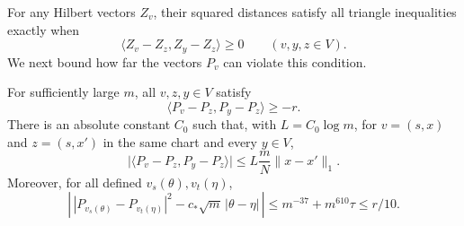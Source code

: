 For any Hilbert vectors $Z_v$, their squared distances satisfy all
triangle inequalities exactly when
\begin{equation}\label{rep:eq:angle}
\langle Z_v-Z_z,Z_y-Z_z\rangle\ge0
\qquad(v,y,z\in V).
\end{equation}
We next bound how far the vectors $P_v$ can violate this condition.

\begin{lemma}
\label{ker:angles}
For sufficiently large $m$, all $v,z,y\in V$ satisfy
\begin{equation}
\label{ker:global-angle}
 \langle P_v-P_z,P_y-P_z\rangle\ge-r.
\end{equation}
There is an absolute constant $C_0$ such that, with $L=C_0\log m$, for
$v=(s,x)$ and $z=(s,x')$ in the same chart and every $y\in V$,
\begin{equation}
\label{ker:local-angle}
 \bigl|\langle P_v-P_z,P_y-P_z\rangle\bigr|
 \le L\frac{m}{N}\|x-x'\|_1.
\end{equation}
Moreover, for all defined $v_s(\theta),v_t(\eta)$,
\begin{equation}
\label{ker:rounded-distance}
 \left|\,|P_{v_s(\theta)}-P_{v_t(\eta)}|^2
       -c_*\sqrt m\,|\theta-\eta|\,\right|
 \le m^{-37}+m^{610}\tau\le r/10.
\end{equation}
\end{lemma}

